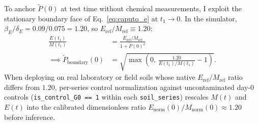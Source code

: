 \documentclass[10pt,twocolumn,a4paper]{article}
\begin{document}
\begin{table}[!htbp]
  \centering
  \caption{\textbf{Reference Soil Atlas Archetypes (\texttt{Arch\_1}--\texttt{Arch\_5}).} Normalized abiotic coordinates, carrying capacity $K_m$, memory order $\alpha$, and biokinetic simulator constants ($K_i \equiv 1.0$, $\beta_E=0.09$, $\delta_E=0.075$; $\Phi_{\text{true}}$ uses $\beta_{\text{pH}}=2.50, \text{pH}_{\text{opt}}=0.65$, exponents $0.35$ and $0.40$).}
  \label{tab:soil_atlas}
  \footnotesize
\end{table}

To anchor $\tilde{P}(0)$ at test time without chemical measurements, I exploit the stationary boundary face of Eq.~\eqref{eq:caputo_e} at $t_1 \to 0$. In the simulator, $\beta_E/\delta_E = 0.09/0.075 = 1.20$, so $E_{\text{ref}}/M_{\text{ref}} \equiv 1.20$:
\begin{equation}
  \begin{aligned}
    \frac{E(t_1)}{M(t_1)} &= \frac{E_{\text{ref}}/M_{\text{ref}}}{1 + \tilde{P}(0)^2} \\
    \implies \tilde{P}_{\text{boundary}}(0) &= \sqrt{\max\!\left(0,\, \frac{1.20}{E(t_1)/M(t_1)} - 1\right)}.
  \end{aligned} \label{eq:p0_boundary}
\end{equation}
When deploying on real laboratory or field soils whose native $E_{\text{ref}}/M_{\text{ref}}$ ratio differs from $1.20$, per-series control normalization against uncontaminated day-0 controls (\texttt{is\_control\_G0 == 1} within each \texttt{soil\_series}) rescales $M(t)$ and $E(t)$ into the calibrated dimensionless ratio $E_{\text{norm}}(0)/M_{\text{norm}}(0) \approx 1.20$ before inference.
\end{document}
